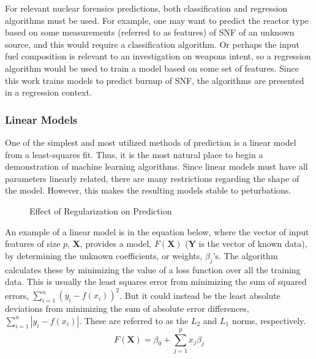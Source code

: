 \setlength\abovedisplayskip{2.5pt}

For relevant nuclear forensics predictions, both classification and regression
algorithms must be used.  For example, one may want to predict the reactor type
based on some measurements (referred to as features) of \gls{SNF} of an unknown
source, and this would require a classification algorithm. Or perhaps the input
fuel composition is relevant to an investigation on weapons intent, so a
regression algorithm would be used to train a model based on some set of
features.  Since this work trains models to predict burnup of \gls{SNF}, the
algorithms are presented in a regression context.

\subsubsection{Linear Models}
\label{sec:linear}

One of the simplest and most utilized methods of prediction is a linear model
from a least-squares fit. Thus, it is the most natural place to begin a
demonstration of machine learning algorithms. Since linear models must have all
parameters linearly related, there are many restrictions regarding the shape of
the model. However, this makes the resulting models stable to peturbations. 

\begin{figure}[!htb]
  \caption{Effect of Regularization on Prediction}
  \label{fig:reg}
\end{figure}

An example of a linear model is in the equation below, where the vector of
input features of size $p$, $\boldsymbol{X}$, provides a model,
$F(\boldsymbol{X})$ ($\boldsymbol{Y}$ is the vector of known
data), by determining the unknown coefficients, or weights,
$\beta_{j}$'s. The algorithm calculates these by minimizing the value of a loss
function over all the training data.  This is usually the least squares error
from minimizing the sum of squared errors, $\sum_{i=1}^{n} (y_i - f(x_i))^2$.
But it could instead be the least absolute deviations from minimizing the sum
of absolute error differences, $\sum_{i=1}^{n} |y_i - f(x_i)|$. These are
referred to as the $L_2$ and $L_1$ norms, respectively.  
\begin{equation}
  F(\boldsymbol{X}) = \beta_{0} +  \sum_{j=1}^{p} x_{j} \beta_{j}
\end{equation}

